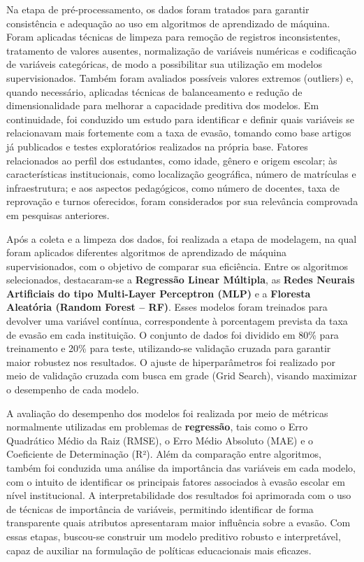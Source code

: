 \documentclass[english, spanish, brazilian]{RBIEarticle} %
\begin{document}
Na etapa de pré-processamento, os dados foram tratados para garantir consistência e adequação ao uso em algoritmos de aprendizado de máquina. Foram aplicadas técnicas de limpeza para remoção de registros inconsistentes, tratamento de valores ausentes, normalização de variáveis numéricas e codificação de variáveis categóricas, de modo a possibilitar sua utilização em modelos supervisionados. Também foram avaliados possíveis valores extremos (outliers) e, quando necessário, aplicadas técnicas de balanceamento e redução de dimensionalidade para melhorar a capacidade preditiva dos modelos. Em continuidade, foi conduzido um estudo para identificar e definir quais variáveis se relacionavam mais fortemente com a taxa de evasão, tomando como base artigos já publicados e testes exploratórios realizados na própria base. Fatores relacionados ao perfil dos estudantes, como idade, gênero e origem escolar; às características institucionais, como localização geográfica, número de matrículas e infraestrutura; e aos aspectos pedagógicos, como número de docentes, taxa de reprovação e turnos oferecidos, foram considerados por sua relevância comprovada em pesquisas anteriores.

Após a coleta e a limpeza dos dados, foi realizada a etapa de modelagem, na qual foram aplicados diferentes algoritmos de aprendizado de máquina supervisionados, com o objetivo de comparar sua eficiência. Entre os algoritmos selecionados, destacaram-se a \textbf{Regressão Linear Múltipla}, as \textbf{Redes Neurais Artificiais do tipo Multi-Layer Perceptron (MLP)} e a \textbf{Floresta Aleatória (Random Forest – RF)}. Esses modelos foram treinados para devolver uma variável contínua, correspondente à porcentagem prevista da taxa de evasão em cada instituição. O conjunto de dados foi dividido em 80\% para treinamento e 20\% para teste, utilizando-se validação cruzada para garantir maior robustez nos resultados. O ajuste de hiperparâmetros foi realizado por meio de validação cruzada com busca em grade (Grid Search), visando maximizar o desempenho de cada modelo.

A avaliação do desempenho dos modelos foi realizada por meio de métricas normalmente utilizadas em problemas de \textbf{regressão}, tais como o Erro Quadrático Médio da Raiz (RMSE), o Erro Médio Absoluto (MAE) e o Coeficiente de Determinação (R²). Além da comparação entre algoritmos, também foi conduzida uma análise da importância das variáveis em cada modelo, com o intuito de identificar os principais fatores associados à evasão escolar em nível institucional. A interpretabilidade dos resultados foi aprimorada com o uso de técnicas de importância de variáveis, permitindo identificar de forma transparente quais atributos apresentaram maior influência sobre a evasão. Com essas etapas, buscou-se construir um modelo preditivo robusto e interpretável, capaz de auxiliar na formulação de políticas educacionais mais eficazes.
\end{document}
